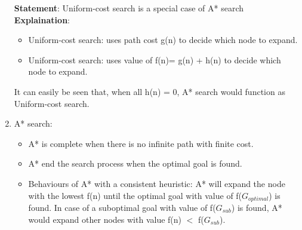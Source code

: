 \documentclass[a4paper, 12pt]{article}
\begin{document}
\begin{enumerate}
	\vspace{0.5cm}
	\textbf{Statement}: Uniform-cost search is a special case of A* search\\
	\textbf{Explaination}: 
		\begin{itemize}
		\item Uniform-cost search: uses path cost g(n) to decide which node to expand.
		\item Uniform-cost search: uses value of f(n)= g(n) + h(n) to decide which node to expand.
		\end{itemize}
		It can easily be seen that, when all h(n) = 0, A* search would function as Uniform-cost search. 
		
	\item A* search:
	\begin{itemize}
		\item A* is complete when there is no infinite path with finite cost.
		\item A* end the search process when the optimal goal is found.
		\item Behaviours of A* with a consistent heuristic: A* will expand the node with the lowest f(n) until the optimal goal with value of f($G_{optimal}$) is found. In case of a suboptimal goal with value of f($G_{sub}$) is found, A* would expand other nodes with value f(n) $<$ f($G_{sub}$).
	\end{itemize}
	
    \end{enumerate}
\end{document}
